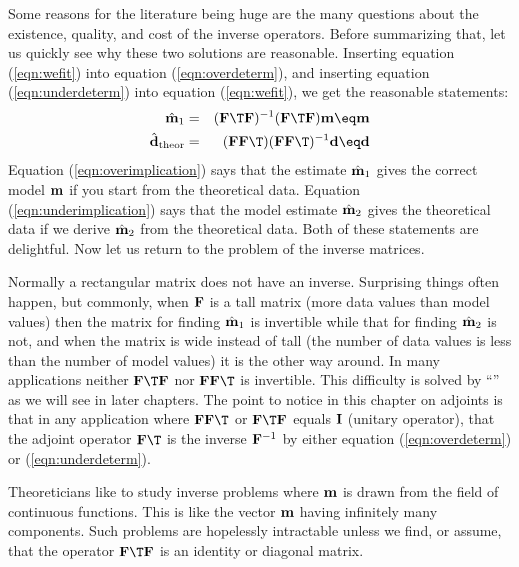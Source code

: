 Some reasons for the literature being huge are the
many questions
about the existence, quality, and cost
of the inverse operators.
Before summarizing that,
let us quickly see why these two solutions are reasonable.
Inserting equation
(\ref{eqn:wefit})
into equation
(\ref{eqn:overdeterm}),
and inserting equation
(\ref{eqn:underdeterm})
into equation
(\ref{eqn:wefit}),
we get the reasonable statements:
\begin{eqnarray}
\hat {\bold m}_1 &=& (\bold F\T\bold F)^{-1}(\bold F\T\bold F)\bold m \eq\bold m
                                                \label{eqn:overimplication} \\
\hat {\bold d}_{\rm theor} &=&
                     (\bold F\bold F\T)(\bold F\bold F\T)^{-1}\bold d \eq\bold d
                                                \label{eqn:underimplication}
\end{eqnarray}
Equation (\ref{eqn:overimplication}) says that the estimate $\hat {\bold m}_1$
gives the correct model $\bold m$
if you start from the theoretical data.
Equation (\ref{eqn:underimplication}) says that the model estimate $\hat {\bold m}_2$
gives the theoretical data if we derive $\hat{\bold m}_2$
from the theoretical data.
Both of these statements are delightful.
Now let us return to the problem of the inverse matrices.

\par
Normally a rectangular matrix does not have an inverse.
Surprising things often happen, but commonly,
when $\bold F$ is a tall matrix 
(more data values than model values)
then the matrix for finding
$\hat{\bold m}_1$
is invertible while that for finding
$\hat{\bold m}_2$
is not,
and when the matrix is wide instead of tall
(the number of data values is less than the number of model values)
it is the other way around.
In many applications neither
$\bold F\T\bold F$ nor
$\bold F\bold F\T$ 
is invertible.  This difficulty is
solved by ``'' as we will see in later chapters.
The point to notice in this chapter on adjoints
is that in any application where
$\bold F \bold F\T$
or
$\bold F\T \bold F$ equals $\bold I$ (unitary operator),
that the adjoint operator $\bold F\T$ is the inverse $\bold F^{-1}$
by either equation (\ref{eqn:overdeterm}) or (\ref{eqn:underdeterm}).
\par
Theoreticians like to study inverse problems where $\bold m$
is drawn from the field of continuous functions.
This is like the vector $\bold m$ having infinitely many components.
Such problems are hopelessly intractable unless we find,
or assume, that the operator
$\bold F\T \bold F$
is an identity or diagonal matrix.


